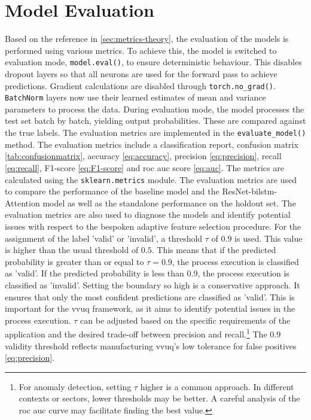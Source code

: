 \section{Model Evaluation}
Based on the reference in \autoref{sec:metrics-theory}, the evaluation of the models is performed using various metrics. To achieve this, the model is switched to evaluation mode, \texttt{model.eval()}, to ensure deterministic behaviour. This disables dropout layers so that all neurons are used for the forward pass to achieve predictions. Gradient calculations are disabled through \texttt{torch.no\_grad()}. \texttt{BatchNorm} layers now use their learned estimates of mean and variance parameters to process the data. During evaluation mode, the model processes the test set batch by batch, yielding output probabilities. These are compared against the true labels. The evaluation metrics are implemented in the \texttt{evaluate\_model()} method. The evaluation metrics include a classification report, confusion matrix \autoref{tab:confusionmatrix}, accuracy \autoref{eq:accuracy}, precision \autoref{eq:precision}, recall \autoref{eq:recall}, F1-score \autoref{eq:F1-score} and \gls{roc} \gls{auc} score \autoref{eq:auc}. The metrics are calculated using the \texttt{sklearn.metrics} module. The evaluation metrics are used to compare the performance of the baseline model and the ResNet-\gls{bilstm}-Attention model as well as the standalone performance on the holdout set. The evaluation metrics are also used to diagnose the models and identify potential issues with respect to the bespoken adaptive feature selection procedure. For the assignment of the label 'valid' or 'invalid', a threshold $\tau$ of $0.9$ is used. This value is higher than the usual threshold of $0.5$. This means that if the predicted probability is greater than or equal to $\tau = 0.9$, the process execution is classified as 'valid'. If the predicted probability is less than $0.9$, the process execution is classified as 'invalid'. Setting the boundary so high is a conservative approach. It ensures that only the most confident predictions are classified as 'valid'. This is important for the \gls{vvuq} framework, as it aims to identify potential issues in the process execution. $\tau$ can be adjusted based on the specific requirements of the application and the desired trade-off between precision and recall.\footnote{For anomaly detection, setting $\tau$ higher is a common approach. In different contexts or sectors, lower thresholds may be better. A careful analysis of the \gls{roc} \gls{auc} curve may facilitate finding the best value.} The $0.9$ validity threshold reflects manufacturing \gls{vvuq}'s low tolerance for false positives \autoref{eq:precision}.